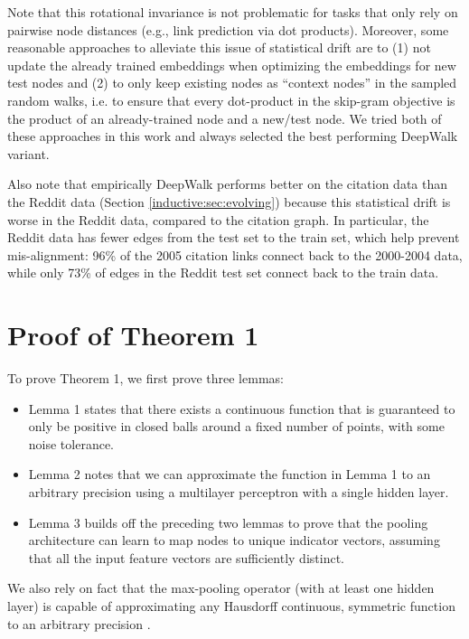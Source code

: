 Note that this rotational invariance is not problematic for tasks that only rely on pairwise node distances (e.g., link prediction via dot products). 
Moreover, some reasonable approaches to alleviate this issue of statistical drift are to (1) not update the already trained embeddings when optimizing the embeddings for new test nodes and (2) to only keep existing nodes as ``context nodes'' in the sampled random walks, i.e. to ensure that every dot-product in the skip-gram objective is the product of an already-trained node and a new/test node.
We tried both of these approaches in this work and always selected the best performing DeepWalk variant. 

Also note that empirically DeepWalk performs better on the citation data than the Reddit data (Section \ref{inductive:sec:evolving}) because this statistical drift is worse in the Reddit data, compared to the citation graph.
In particular, the Reddit data has fewer edges from the test set to the train set, which help prevent mis-alignment: 96\% of the 2005 citation links connect back to the 2000-2004 data, while only 73\% of edges in the Reddit test set connect back to the train data. 

\section{Proof of Theorem 1}

\newcommand{\R}{\mathbb{R}}
To prove Theorem 1, we first prove three lemmas:
\begin{itemize}
\item
Lemma 1 states that there exists a continuous function that is guaranteed to only be positive in closed balls around a fixed number of points, with some noise tolerance. 
\item
Lemma 2 notes that we can approximate the function in Lemma 1 to an arbitrary precision using a multilayer perceptron with a single hidden layer.
\item
Lemma 3 builds off the preceding two lemmas to prove that the pooling architecture can learn to map nodes to unique indicator vectors, assuming that all the input feature vectors are sufficiently distinct. 
\end{itemize}
We also rely on fact that the max-pooling operator (with at least one hidden layer) is capable of approximating any Hausdorff continuous, symmetric function to an arbitrary  precision \cite{qi2016pointnet}.

